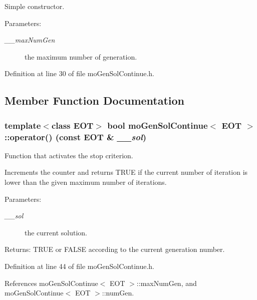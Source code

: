 Simple constructor. 

\begin{Desc}
\item[Parameters:]
\begin{description}
\item[{\em \_\-\_\-max\-Num\-Gen}]the maximum number of generation. \end{description}
\end{Desc}


Definition at line 30 of file mo\-Gen\-Sol\-Continue.h.

\subsection{Member Function Documentation}
\subsubsection{\setlength{\rightskip}{0pt plus 5cm}template$<$class EOT$>$ bool {\bf mo\-Gen\-Sol\-Continue}$<$ EOT $>$::operator() (const EOT \& {\em \_\-\_\-sol})\hspace{0.3cm}{\tt  [inline]}}\label{classmo_gen_sol_continue_457257cd73b474d6f7783d84d02c2e61}


Function that activates the stop criterion. 

Increments the counter and returns TRUE if the current number of iteration is lower than the given maximum number of iterations.

\begin{Desc}
\item[Parameters:]
\begin{description}
\item[{\em \_\-\_\-sol}]the current solution. \end{description}
\end{Desc}
\begin{Desc}
\item[Returns:]TRUE or FALSE according to the current generation number. \end{Desc}


Definition at line 44 of file mo\-Gen\-Sol\-Continue.h.

References mo\-Gen\-Sol\-Continue$<$ EOT $>$::max\-Num\-Gen, and mo\-Gen\-Sol\-Continue$<$ EOT $>$::num\-Gen.
